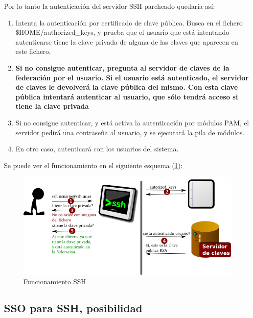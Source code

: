     Por lo tanto la autenticación del servidor SSH parcheado quedaría así:

    \begin{enumerate}

    \item Intenta la autenticación por certificado de clave pública. Busca
    en el fichero \$HOME/authorized\_keys, y prueba que el usuario que está
    intentando autenticarse tiene la clave privada de alguna de las claves
    que aparecen en este fichero.

    \item \textbf{Si no consigue autenticar, pregunta al servidor de claves
    de la federación por el usuario. Si el usuario está autenticado, el
    servidor de claves le devolverá la clave pública del mismo. Con esta
    clave pública intentará autenticar al usuario, que sólo tendrá acceso
    si tiene la clave privada}

    \item Si no consigue autenticar, y está activa la autenticación por
    módulos PAM, el servidor pedirá una contraseña al usuario, y se
    ejecutará la pila de módulos.

    \item En otro caso, autenticará con los usuarios del sistema.

    \end{enumerate}

    Se puede ver el funcionamiento en el siguiente esquema
    (\ref{fig:funcionamientossh}):

    \begin{figure}[htp!]
        \centering
            \includegraphics[width=\textwidth]{img/funcionamientossh.png}
            \caption{Funcionamiento SSH}
        \label{fig:funcionamientossh}
    \end{figure}


        \subsection{SSO para SSH, posibilidad}

